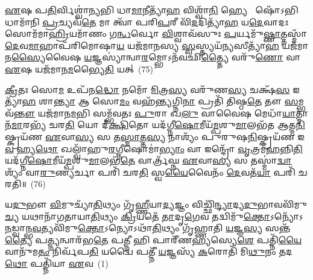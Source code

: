 \-\ul{𑌏}\-𑌷 𑌪\-\ul{𑌤𑌿}\-𑌰𑍍𑌵𑌿𑌶𑍍𑌵𑌾॑\-\ul{𑌨𑍍𑌯}\-𑌭𑌿 𑌧𑌾\-\ul{𑌮𑌾}\-𑌨𑍀𑌤𑍍𑌯𑌾᳴\-\ul{𑌹} 𑌵𑌿𑌶𑍍𑌵𑌾᳴\-\ul{𑌨𑌿} 𑌹𑍍𑌯𑍇  𑌷𑍋᳴\-𑌽𑌭𑌿 𑌧𑌾𑌮𑌾᳴𑌨𑌿 \ul{𑌪𑍍𑌰}\-𑌚𑍍𑌯𑌵᳴\-\ul{𑌤𑍇} 𑌮𑌾 𑌤𑍍𑌵𑌾᳴ 𑌪𑌰𑌿\-\ul{𑌪}\-𑌰𑍀 𑌵𑌿᳴\-\ul{𑌦}\-𑌦𑌿𑌤𑍍𑌯𑌾᳴\-\ul{𑌹} 𑌯\-\ul{𑌦𑍇}\-𑌵𑌾𑌦𑌃 𑌸𑍋𑌮᳴𑌮𑌾\-\ul{𑌹𑍍𑌰𑌿}\-𑌯𑌮𑌾᳴𑌣𑌂 𑌗\-\ul{𑌨𑍍𑌧}\-𑌰𑍍𑌵𑍋 \ul{𑌵𑌿}\-𑌶𑍍𑌵𑌾𑌵᳴𑌸𑍁𑌃 \ul{𑌪}\-𑌰𑍍𑌯𑌮𑍁᳴\-\ul{𑌷𑍍𑌣𑌾}\-𑌤𑍍𑌤𑌸𑍍𑌮𑌾᳴\-\ul{𑌦𑍇}\-𑌵\-\ul{𑌮𑌾}\-𑌹𑌾𑌪᳴𑌰𑌿𑌮𑍋𑌷𑌾\-\ul{𑌯} 𑌯𑌜᳴𑌮𑌾𑌨𑌸𑍍𑌯 \ul{𑌸𑍍𑌵}\-𑌸𑍍𑌤𑍍𑌯𑌯᳴\-\ul{𑌨𑍍𑌯}\-𑌸𑍀𑌤𑍍𑌯𑌾᳴\-\ul{𑌹} 𑌯𑌜᳴𑌮𑌾𑌨\-\ul{𑌸𑍍𑌯𑍈}\-𑌵𑍈𑌷 \ul{𑌯}\-𑌜𑍍𑌞𑌸𑍍𑌯𑌾॑𑌨𑍍𑌵𑌾\-\ul{𑌰}\-𑌮𑍍𑌭𑍋\-𑌽𑌨᳴𑌵𑌛𑌿\-\ul{𑌤𑍍𑌤𑍍𑌯𑍈} 𑌵𑌰𑍁᳴\-\ul{𑌣𑍋} 𑌵𑌾 \ul{𑌏}\-𑌷 𑌯𑌜᳴𑌮𑌾𑌨\-\ul{𑌮}\-𑌭𑍍𑌯𑍈\-\ul{𑌤𑌿} 𑌯𑌤𑍍~(75)

\-\ul{𑌕𑍍𑌰𑍀}\-𑌤𑌃 𑌸𑍋\-\ul{𑌮} 𑌉𑌪᳴𑌨\-\ul{𑌦𑍍𑌧𑍋} 𑌨𑌮𑍋᳴ \ul{𑌮𑌿}\-𑌤𑍍𑌰\-\ul{𑌸𑍍𑌯} 𑌵𑌰𑍁᳴𑌣\-\ul{𑌸𑍍𑌯} 𑌚𑌕𑍍𑌷᳴\-\ul{𑌸} 𑌇𑌤𑍍𑌯𑌾᳴\-\ul{𑌹} 𑌶𑌾\-\ul{𑌨𑍍𑌤𑍍𑌯𑌾} 𑌆 𑌸𑍋\-\ul{𑌮𑌂} 𑌵𑌹᳴\-\ul{𑌨𑍍𑌤𑍍𑌯}\-𑌗𑍍𑌨𑌿\-\ul{𑌨𑌾} 𑌪𑍍𑌰𑌤𑌿᳴ 𑌤𑌿𑌷𑍍𑌠\-\ul{𑌤𑍇} 𑌤𑍗 \ul{𑌸}\-𑌮𑍍𑌭𑌵᳴\-\ul{𑌨𑍍𑌤𑍗} 𑌯𑌜᳴𑌮𑌾𑌨\-\ul{𑌮}\-𑌭𑌿 𑌸𑌮𑍍𑌭᳴𑌵𑌤𑌃 \ul{𑌪𑍁}\-𑌰𑌾 𑌖\-\ul{𑌲𑍁} 𑌵𑌾𑌵𑍈𑌷 𑌮𑍇𑌧𑌾᳴\-\ul{𑌯𑌾}\-𑌤𑍍𑌮𑌾𑌨᳴\-\ul{𑌮𑌾}\-𑌰𑌭𑍍𑌯᳴ 𑌚𑌰\-\ul{𑌤𑌿} 𑌯𑍋 𑌦𑍀॑\-\ul{𑌕𑍍𑌷𑌿}\-𑌤𑍋 𑌯𑌦᳴𑌗𑍍𑌨𑍀\-\ul{𑌷𑍋}\-𑌮𑍀𑌯᳴\-\ul{𑌮𑍍𑌪}\-𑌶𑍁\-\ul{𑌮𑌾}\-𑌲𑌭᳴𑌤 𑌆𑌤𑍍𑌮\-\ul{𑌨𑌿}\-𑌷𑍍𑌕𑍍𑌰𑌯᳴𑌣 \ul{𑌏}\-𑌵𑌾\-\ul{𑌸𑍍𑌯} 𑌸 𑌤\-\ul{𑌸𑍍𑌮𑌾}\-𑌤𑍍𑌤\-\ul{𑌸𑍍𑌯} 𑌨𑌾𑌶𑍍𑌯𑌂᳴ 𑌪𑍁𑌰𑍁𑌷\-\ul{𑌨𑌿}\-𑌷𑍍𑌕𑍍𑌰𑌯᳴𑌣 𑌇\-\ul{𑌵} 𑌹𑍍𑌯\-\ul{𑌥𑍋} 𑌖𑌲𑍍𑌵𑌾᳴𑌹𑍁\-\ul{𑌰}\-𑌗𑍍𑌨𑍀𑌷𑍋𑌮𑌾॑\-\ul{𑌭𑍍𑌯𑌾𑌂} 𑌵𑌾 𑌇𑌨𑍍𑌦𑍍𑌰𑍋᳴ \ul{𑌵𑍃}\-𑌤𑍍𑌰𑌮᳴\-\ul{𑌹}\-𑌨𑍍𑌨𑌿\-\ul{𑌤𑌿} 𑌯𑌦᳴𑌗𑍍𑌨𑍀\-\ul{𑌷𑍋}\-𑌮𑍀𑌯᳴\-\ul{𑌮𑍍𑌪}\-𑌶𑍁\-\ul{𑌮𑌾}\-𑌲𑌭᳴\-\ul{𑌤𑍇} 𑌵𑌾𑌰𑍍𑌤𑍍𑌰᳴𑌘𑍍𑌨 \ul{𑌏}\-𑌵𑌾\-\ul{𑌸𑍍𑌯} 𑌸 𑌤𑌸𑍍𑌮𑌾॑\-\ul{𑌦𑍍𑌵𑌾}\-𑌶𑍍𑌯𑌂᳴ 𑌵𑌾\-\ul{𑌰𑍁}\-𑌣𑍍𑌯𑌰𑍍𑌚𑌾 𑌪𑌰𑌿᳴ 𑌚𑌰\-\ul{𑌤𑌿} 𑌸𑍍𑌵\-\ul{𑌯𑍈}\-𑌵𑍈𑌨𑌂᳴ \ul{𑌦𑍇}\-𑌵𑌤᳴\-\ul{𑌯𑌾} 𑌪𑌰𑌿᳴ 𑌚𑌰𑌤𑌿॥~(76)

{\anuvakamend[{\-\ul{𑌅}\-\-\ul{𑌨𑍍𑌵𑌾}\-𑌰𑌭𑍍𑌯𑍋𑌥𑍍𑌸𑌰𑍍𑌵𑌾᳴𑌭𑌿\-\ul{𑌰𑍇}\-𑌵 𑌸𑍂𑌰𑍍𑌯𑌂᳴ \ul{𑌭𑍂}\-𑌤𑌾\-\ul{𑌨𑌾}\-\-\ul{𑍞} 𑌹𑍍𑌯𑍇᳴\-\ul{𑌤𑌿} 𑌯𑌦𑌾᳴𑌹𑍁𑌃 \ul{𑌸}\-𑌪𑍍𑌤𑌵𑌿𑍞᳴𑌶𑌤𑌿𑌶𑍍𑌚}]}%


{\anuvakamend[{𑌯\-\ul{𑌦𑍁}\-𑌭𑍗 𑌦𑍇᳴𑌵𑌾\-\ul{𑌸𑍁}\-𑌰𑌾 \ul{𑌮𑌿}\-𑌥𑌸𑍍𑌤𑍇𑌷𑌾𑍞᳴ 𑌸𑍁\-\ul{𑌵}\-𑌰𑍍𑌗𑌂 𑌯𑌦𑍍𑌵𑌾 𑌅𑌨𑍀᳴𑌶𑌾𑌨𑌃 \ul{𑌪𑍁}\-𑌰𑍋𑌹᳴𑌵𑌿\-\ul{𑌷𑌿} 𑌤𑍇\-\ul{𑌭𑍍𑌯𑌃} 𑌸𑍋𑌤𑍍𑌤᳴𑌰\-\ul{𑌵𑍇}\-𑌦𑌿\-\ul{𑌰𑍍𑌬}\-𑌦𑍍𑌧𑌂 \ul{𑌦𑍇}\-𑌵𑌸𑍍𑌯𑌾\-\ul{𑌭𑍍𑌰𑌿}\-\-\ul{𑍞} 𑌶𑌿\-\ul{𑌰𑍋} 𑌵𑌾 𑌏𑌕𑌾᳴\-𑌦𑌶}]}%

\setcounter{anuvakam}{0}
𑌯\-\ul{𑌦𑍁}\-𑌭𑍗 \ul{𑌵𑌿}\-𑌮𑍁𑌚𑍍𑌯𑌾᳴\-\ul{𑌤𑌿}\-𑌥𑍍𑌯𑌂 𑌗𑍃᳴\-\ul{𑌹𑍍𑌣𑍀}\-𑌯𑌾\-\ul{𑌦𑍍𑌯}\-𑌜𑍍𑌞𑌂 𑌵𑌿𑌚𑍍𑌛𑌿᳴\-\ul{𑌨𑍍𑌦𑍍𑌯𑌾}\-𑌦𑍍𑌯\-\ul{𑌦𑍁}\-𑌭𑌾𑌵𑌵𑌿᳴𑌮𑍁\-\ul{𑌚𑍍𑌯} 𑌯𑌥𑌾𑌨𑌾᳴𑌗𑌤𑌾𑌯𑌾\-\ul{𑌤𑌿}\-𑌥𑍍𑌯𑌂 \ul{𑌕𑍍𑌰𑌿}\-𑌯𑌤𑍇᳴ \ul{𑌤𑌾}\-𑌦𑍃\-\ul{𑌗𑍇}\-𑌵 𑌤𑌦𑍍𑌵𑌿𑌮𑍁᳴\-\ul{𑌕𑍍𑌤𑍋}\-\-𑌽𑌨𑍍𑌯𑍋᳴\-𑌽\-\ul{𑌨}\-𑌡𑍍𑌵𑌾𑌨𑍍𑌭\-\ul{𑌵}\-𑌤𑍍𑌯𑌵𑌿᳴𑌮𑍁\-\ul{𑌕𑍍𑌤𑍋}\-\-𑌽𑌨𑍍𑌯𑍋\-𑌽𑌥𑌾᳴\-\ul{𑌤𑌿}\-𑌥𑍍𑌯𑌂 𑌗𑍃᳴𑌹𑍍𑌣𑌾𑌤𑌿 \ul{𑌯}\-𑌜𑍍𑌞\-\ul{𑌸𑍍𑌯} 𑌸𑌨𑍍𑌤᳴\-\ul{𑌤𑍍𑌯𑍈} 𑌪\-\ul{𑌤𑍍𑌨𑍍𑌯}\-𑌨𑍍𑌵𑌾𑌰᳴𑌭\-\ul{𑌤𑍇} 𑌪\-\ul{𑌤𑍍𑌨𑍀} 𑌹𑌿 𑌪𑌾𑌰𑍀᳴𑌣\-\ul{𑌹𑍍𑌯}\-𑌸𑍍𑌯𑍇\-\ul{𑌶𑍇} 𑌪𑌤𑍍𑌨𑌿᳴\-\ul{𑌯𑍈}\-𑌵𑌾𑌨𑍁᳴𑌮\-\ul{𑌤𑌂} 𑌨𑌿𑌰𑍍𑌵᳴𑌪\-\ul{𑌤𑌿} 𑌯𑌦𑍍𑌵𑍈 𑌪𑌤𑍍𑌨𑍀᳴ \ul{𑌯}\-𑌜𑍍𑌞𑌸𑍍𑌯᳴ \ul{𑌕}\-𑌰𑍋𑌤𑌿᳴ 𑌮𑌿\-\ul{𑌥𑍁}\-𑌨𑌂 𑌤𑌦\-\ul{𑌥𑍋} 𑌪𑌤𑍍𑌨𑌿᳴𑌯𑌾 \ul{𑌏}\-𑌵~(1)

